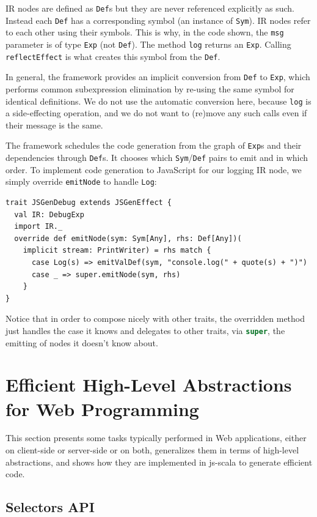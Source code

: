 \documentclass{llncs}
\newcommand{\code}[1]{\lstinline[language=Scala,columns=fixed,basicstyle=\footnotesize]|#1|}
\begin{document}
IR nodes are defined as \code{Def}s but they are never referenced
explicitly as such. Instead each \code{Def} has a corresponding symbol
(an instance of \code{Sym}). IR nodes refer to each other using their
symbols. This is why, in the code shown, the \code{msg} parameter is
of type \code{Exp} (not \code{Def}). The method \code{log} 
returns an \code{Exp}. Calling \code{reflectEffect} is what creates
this symbol from the \code{Def}.

In general, the framework provides an implicit conversion from
\code{Def} to \code{Exp}, which performs common subexpression
elimination by re-using the same symbol for identical definitions. We
do not use the automatic conversion here, because \code{log} is a 
side-effecting operation, and we do not want 
to (re)move any such calls even if their message
is the same.

The framework schedules the code generation from the graph of
\code{Exp}s and their dependencies through \code{Def}s. It chooses
which \code{Sym}/\code{Def} pairs to emit and in which order. To
implement code generation to JavaScript for our logging IR node, we
simply override \code{emitNode} to handle \code{Log}:
\begin{lstlisting}
trait JSGenDebug extends JSGenEffect {
  val IR: DebugExp
  import IR._
  override def emitNode(sym: Sym[Any], rhs: Def[Any])(
    implicit stream: PrintWriter) = rhs match {
      case Log(s) => emitValDef(sym, "console.log(" + quote(s) + ")")
      case _ => super.emitNode(sym, rhs)
    }
}
\end{lstlisting}
Notice that in order to compose nicely with other traits, the
overridden method just handles the case it knows and delegates to
other traits, via \code{super}, the emitting of nodes it doesn't know
about.


\section{Efficient High-Level Abstractions for Web Programming}
\label{sec:contribution}

This section presents some tasks typically performed in Web applications, either on client-side or
server-side or on both, generalizes them in terms of high-level abstractions, and shows how they are
implemented in js-scala to generate efficient code.

\subsection{Selectors API}
\label{sec:selectors}
\end{document}
